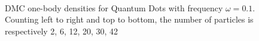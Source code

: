 \begin{figure}
\begin{center}
   \\
  \caption{DMC one-body densities for Quantum Dots with frequency $\omega=0.1$. Counting left to right and top to bottom, the number of particles is respectively 2, 6, 12, 20, 30, 42}
  \label{fig:OBD_DMC_QDOTS_w01}
 \end{center}
\end{figure}

\clearpage

